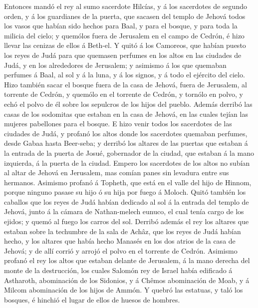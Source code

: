  Entonces mandó el rey al sumo sacerdote Hilcías, y á los
sacerdotes de segundo orden, y á los guardianes de la puerta, que
sacasen del templo de Jehová todos los vasos que habían sido hechos para
Baal, y para el bosque, y para toda la milicia del cielo; y quemólos
fuera de Jerusalem en el campo de Cedrón, é hizo llevar las cenizas de
ellos á Beth-el.  Y quitó á los Camoreos, que habían puesto
los reyes de Judá para que quemasen perfumes en los altos en las
ciudades de Judá, y en los alrededores de Jerusalem; y asimismo á los
que quemaban perfumes á Baal, al sol y á la luna, y á los signos, y á
todo el ejército del cielo.  Hizo también sacar el bosque
fuera de la casa de Jehová, fuera de Jerusalem, al torrente de Cedrón, y
quemólo en el torrente de Cedrón, y tornólo en polvo, y echó el polvo de
él sobre los sepulcros de los hijos del pueblo.  Además
derribó las casas de los sodomitas que estaban en la casa de Jehová, en
las cuales tejían las mujeres pabellones para el bosque.  E
hizo venir todos los sacerdotes de las ciudades de Judá, y profanó los
altos donde los sacerdotes quemaban perfumes, desde Gabaa hasta
Beer-seba; y derribó los altares de las puertas que estaban á la entrada
de la puerta de Josué, gobernador de la ciudad, que estaban á la mano
izquierda, á la puerta de la ciudad.  Empero los sacerdotes
de los altos no subían al altar de Jehová en Jerusalem, mas comían panes
sin levadura entre sus hermanos.  Asimismo profanó á
Topheth, que está en el valle del hijo de Hinnom, porque ninguno pasase
su hijo ó su hija por fuego á Moloch.  Quitó también los
caballos que los reyes de Judá habían dedicado al sol á la entrada del
templo de Jehová, junto á la cámara de Nathan-melech eunuco, el cual
tenía cargo de los ejidos; y quemó al fuego los carros del sol.
 Derribó además el rey los altares que estaban sobre la
techumbre de la sala de Achâz, que los reyes de Judá habían hecho, y los
altares que había hecho Manasés en los dos atrios de la casa de Jehová;
y de allí corrió y arrojó el polvo en el torrente de Cedrón.
 Asimismo profanó el rey los altos que estaban delante de
Jerusalem, á la mano derecha del monte de la destrucción, los cuales
Salomón rey de Israel había edificado á Astharoth, abominación de los
Sidonios, y á Chêmos abominación de Moab, y á Milcom abominación de los
hijos de Ammón.  Y quebró las estatuas, y taló los bosques,
é hinchió el lugar de ellos de huesos de hombres.

